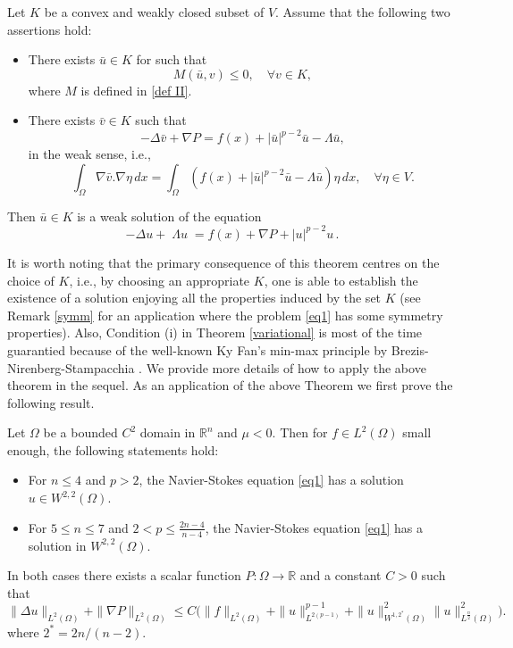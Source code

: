 \documentclass[reqno]{amsart}
\begin{document}
\begin{theorem}\label{variational}
Let  \( K\) be a convex and weakly closed subset of \(V\). Assume that the following
two assertions hold:
\begin{itemize}
\item[(i)] There  exists \(\bar{u} \in K\) for   such that
    \[
    M(\bar{u}, v)\leq 0,\quad  \forall v\in  K,
    \]
    where \(M \) is defined in \eqref{def II}.

\item[(ii)] There exists \(\bar{v} \in K\) such that \[-\Delta \bar{v} + \nabla P = f(x) +|\bar{u}|^{p-2}\bar{u} - \Lambda \bar{u},\]
    in the weak sense, i.e.,
\[
   \int_\Omega\nabla\bar{v}.\nabla\eta\,dx
   =\int_\Omega (f(x)  +|\bar{u}|^{p-2}\bar{u} -
   \Lambda \bar{u})\eta\,dx,\quad \forall\eta\in V.
\]
\end{itemize}
Then \(\bar{u} \in K\) is a weak solution of the equation
\[
-\Delta u+ \;\Lambda u \; = f(x) + \nabla P +|u|^{p-2}u \,.
\]
\end{theorem}
It is worth noting  that the primary consequence of this theorem centres on the choice of
$K$, i.e., by choosing an appropriate $K$, one is able to establish the existence of a
solution enjoying all the
properties induced by the set $K$ (see Remark \ref{symm} for an application where the
problem \eqref{eq1} has some symmetry properties).
Also,  Condition (i) in Theorem \ref{variational} is most of the time guarantied
because of the well-known Ky Fan's min-max principle by Brezis-Nirenberg-Stampacchia
\cite{HB}.
We provide more details of how to apply the above theorem in the sequel.
As an application of the above Theorem we first prove the following result.

\begin{theorem}\label{main theorem 1}
Let \(\Omega\) be a  bounded \(C^2\) domain in \(\mathbb{R} ^n\) and  \(\mu<0\).
Then for \(f\in L^2(\Omega) \) small enough,  the following statements hold:
 \begin{itemize}
 \item[(i)] For \(n\leq 4\) and \(p>2\), the Navier-Stokes equation
     \eqref{eq1} has a  solution \(u \in  W^{2,2}(\Omega)  \).

 \item[(ii)] For \(5\leq n\leq 7\) and  \( 2< p \leq \frac{2n-4}{n-4}\),
 the Navier-Stokes equation \eqref{eq1} has a  solution in \( W^{2,2}(\Omega)\).
 \end{itemize}
In both cases there exists a scalar function $P:\Omega \to \mathbb{R}$ and a constant $C>0$
such that
\begin{equation} \label{nabla11}
     \rVert \Delta {u} \rVert_{L^2(\Omega)}+\rVert \nabla P \rVert_{L^2(\Omega)}
     \leq C\big( \rVert f\rVert_{L^2(\Omega)}+\rVert u\rVert^{p-1}_{L^{2(p-1)}}
     +\rVert {u}\rVert^{2}_{W^{1,2^*}(\Omega)} \rVert  {u}\rVert^2_{L^{\frac{n}{2}}(\Omega)} \big) .
\end{equation}
  where $2^*=2n/(n-2)$.
\end{theorem}
\end{document}
